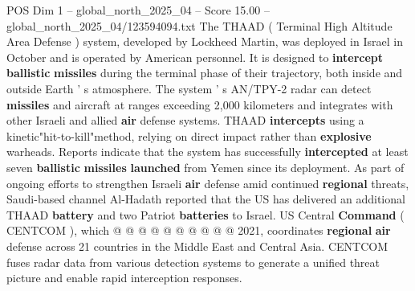 \begin{textsample}{POS Dim 1 – global\_north\_2025\_04 – Score 15.00 – global\_north\_2025\_04/123594094.txt}
The THAAD ( Terminal High Altitude Area Defense ) system, developed by Lockheed Martin, was deployed in Israel in October and is operated by American personnel.
It is designed to \textbf{intercept} \textbf{ballistic} \textbf{missiles} during the terminal phase of their trajectory, both inside and outside Earth ' s atmosphere.
The system ' s AN/TPY-2 radar can detect \textbf{missiles} and aircraft at ranges exceeding 2,000 kilometers and integrates with other Israeli and allied \textbf{air} defense systems.
THAAD \textbf{intercepts} using a kinetic"hit-to-kill"method, relying on direct impact rather than \textbf{explosive} warheads.
Reports indicate that the system has successfully \textbf{intercepted} at least seven \textbf{ballistic} \textbf{missiles} \textbf{launched} from Yemen since its deployment.
As part of ongoing efforts to strengthen Israeli \textbf{air} defense amid continued \textbf{regional} threats, Saudi-based channel Al-Hadath reported that the US has delivered an additional THAAD \textbf{battery} and two Patriot \textbf{batteries} to Israel.
US Central \textbf{Command} ( CENTCOM ), which @ @ @ @ @ @ @ @ @ @ 2021, coordinates \textbf{regional} \textbf{air} defense across 21 countries in the Middle East and Central Asia.
CENTCOM fuses radar data from various detection systems to generate a unified threat picture and enable rapid interception responses.

\end{textsample}
